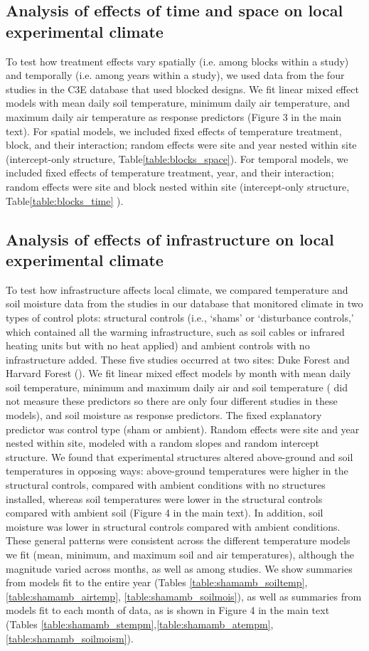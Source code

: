 \documentclass{article}
\begin{document}
\subsection* {Analysis of effects of time and space on local experimental climate}
To test how treatment effects vary spatially (i.e. among blocks within a study) and temporally (i.e. among years within a study), we used data from the four studies in the C3E database that used blocked designs. We fit linear mixed effect models with mean daily soil temperature, minimum daily air temperature, and maximum daily air temperature as response predictors (Figure 3 in the main text). For spatial models, we included fixed effects of temperature treatment, block, and their interaction; random effects were site and year nested within site (intercept-only structure, Table\ref{table:blocks_space}).  For temporal models, we included fixed effects of temperature treatment, year, and their interaction; random effects were site and block nested within site (intercept-only structure, Table\ref{table:blocks_time}
). 
\subsection* {Analysis of effects of infrastructure on local experimental climate}
To test how infrastructure affects local climate, we compared temperature and soil moisture data from the studies in our database that
monitored climate in two types of control plots: structural controls (i.e., `shams' or `disturbance controls,'
which contained all the warming infrastructure, such as soil cables or infrared heating units but with no heat
applied) and ambient controls with no infrastructure added. These five studies occurred at two sites: Duke Forest and Harvard Forest (\citep{farnsworth1995,clark20141,marchin2015,pelini2011}). We fit linear mixed effect models by month with mean daily soil temperature, minimum and maximum daily air and soil temperature (\citep{farnsworth1995} did not measure these predictors so there are only four different studies in these models), and soil moisture as response predictors. The fixed explanatory predictor was control type (sham or ambient). Random effects were site and year nested within site, modeled with a random slopes and random intercept structure. 
We found that experimental structures altered above-ground and soil temperatures in opposing ways: above-ground
temperatures were higher in the structural controls, compared with ambient conditions with no
structures installed, whereas soil temperatures were lower in the structural controls compared with ambient
soil (Figure 4 in the main text).  In addition, soil moisture was lower in
structural controls compared with ambient conditions. These general patterns were consistent across the different temperature models we fit (mean,
minimum, and maximum soil and air temperatures), although the magnitude varied across months, as well
as among studies. We show summaries from models fit to the entire year (Tables \ref{table:shamamb_soiltemp},\ref{table:shamamb_airtemp}, \ref{table:shamamb_soilmois}), as well as summaries from models fit to each month of data, as is shown in Figure 4 in the main text (Tables \ref{table:shamamb_stempm},\ref{table:shamamb_atempm}, \ref{table:shamamb_soilmoism}).
\end{document}
